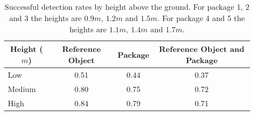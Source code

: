 \begin{table}
\centering
\begin{tabular}{@{} l *3c @{}}
\toprule
 \multicolumn{1}{c}{Height ($m$)} & Reference Object  & Package  & Reference Object and Package  \\ 
\midrule
 Low 		& 0.51 & 0.44 & 0.37 \\ 
 Medium 	& 0.80 & 0.75 & 0.72 \\
 High		& 0.84 & 0.79 & 0.71 \\
\bottomrule
 \end{tabular}
 \caption{Successful detection rates by height above the ground. For package 1, 2 and 3 the heights are $0.9m$, $1.2m$ and $1.5m$. For package 4 and 5 the heights are $1.1m$, $1.4m$ and $1.7m$.} 
\label{table:detection_by_height}
\end{table}